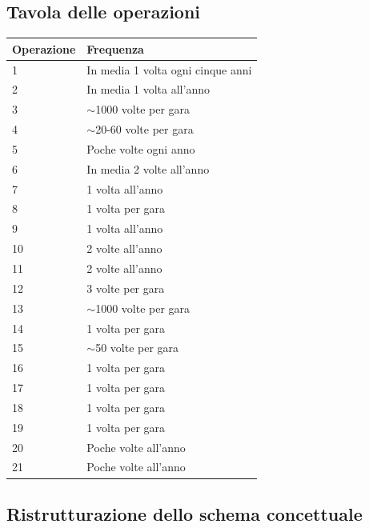 \documentclass[11pt]{article}
\begin{document}
\subsection{Tavola delle operazioni}
\begin{center}
    \begin{tabular}{ |l|l| }
        \hline
        \textbf{Operazione} & \textbf{Frequenza} \\

        \hline
        1 & In media 1 volta ogni cinque anni \\
        \hline
        2 & In media 1 volta all'anno \\
        \hline
        3 & $\sim$1000 volte per gara \\
        \hline
        4 & $\sim$20-60 volte per gara \\ 
        \hline
        5 & Poche volte ogni anno \\
        \hline
        6 & In media 2 volte all'anno \\ 
        \hline
        7 & 1 volta all'anno \\
        \hline
        8 & 1 volta per gara \\
        \hline
        9 & 1 volta all'anno \\
        \hline
        10 & 2 volte all'anno \\
        \hline
        11 & 2 volte all'anno \\
        \hline
        12 & 3 volte per gara \\
        \hline
        13 & $\sim$1000 volte per gara \\
        \hline
        14 & 1 volta per gara \\
        \hline
        15 & $\sim$50 volte per gara \\
        \hline
        16 & 1 volta per gara \\
        \hline
        17 & 1 volta per gara \\
        \hline
        18 & 1 volta per gara \\
        \hline
        19 & 1 volta per gara \\
        \hline
        20 & Poche volte all'anno \\
        \hline
        21 & Poche volte all'anno \\
        \hline
    \end{tabular}
\end{center}

\subsection{Ristrutturazione dello schema concettuale}
\end{document}
